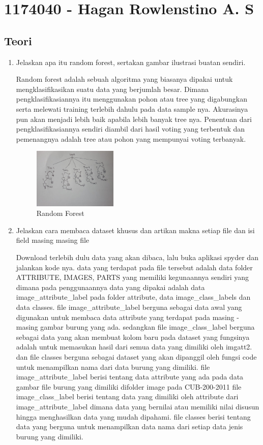 \section{1174040 - Hagan Rowlenstino A. S}
    \subsection{Teori}
    \begin{enumerate}
        \item Jelaskan apa itu random forest, sertakan gambar ilustrasi buatan sendiri.\par
        Random forest adalah sebuah algoritma yang biasanya dipakai untuk mengklasifikasikan suatu data yang berjumlah besar. Dimana pengklasifikasiannya itu menggunakan pohon atau tree yang digabungkan serta melewati training terlebih dahulu pada data sample nya. Akurasinya pun akan menjadi lebih baik apabila lebih banyak tree nya. Penentuan dari pengklasifikasiannya sendiri diambil dari hasil voting yang terbentuk dan pemenangnya adalah tree atau pohon yang mempunyai voting terbanyak.
        \begin{figure}[H]
            \includegraphics[width=4cm]{figures/1174040/chapter3/forest.jpeg}
            \centering
            \caption{Random Forest}
        \end{figure}

        \item Jelaskan cara membaca dataset khusus dan artikan makna setiap ﬁle dan isi ﬁeld masing masing ﬁle 
\par
        Download terlebih dulu data yang akan dibaca, lalu buka aplikasi spyder dan jalankan kode nya. data yang terdapat pada file tersebut adalah data folder ATTRIBUTE, IMAGES, PARTS yang memiliki kegunaannya sendiri yang dimana pada penggunaannya data yang dipakai adalah data image\_attribute\_label pada folder attribute, data image\_class\_labels dan data classes.
        file image\_attribute\_label berguna sebagai data awal yang digunakan untuk membaca data attribute yang terdapat pada masing - masing gambar burung yang ada.
        sedangkan file image\_class\_label berguna sebagai data yang akan membuat kolom baru pada dataset yang fungsinya adalah untuk memasukan hasil dari semua data yang dimiliki oleh imgatt2.
        dan file classes berguna sebagai dataset yang akan dipanggil oleh fungsi code untuk menampilkan nama dari data burung yang dimiliki. file image\_attribute\_label
        berisi tentang data attribute yang ada pada data gambar file burung yang dimiliki difolder image pada CUB-200-2011
        file image\_class\_label
        berisi tentang data yang dimiliki oleh attribute dari image\_attribute\_label dimana data yang bernilai atau memiliki nilai disusun hingga menghasilkan data yang mudah dipahami.
        file classes
        berisi tentang data yang berguna untuk menampilkan data nama dari setiap data jenis burung yang dimiliki.


\end{enumerate}
